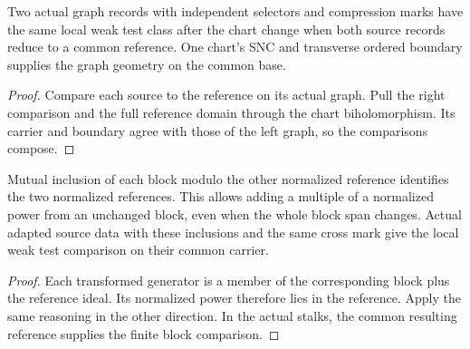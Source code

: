 \begin{theorem}
\label{hir:g1-independent-graph-common-reduction}
\leanok
Two actual graph records with independent selectors and compression
marks have the same local weak test class after the chart change
when both source records reduce to a common reference. One chart's
SNC and transverse ordered boundary supplies the graph geometry
on the common base.
\end{theorem}
\begin{proof}
Compare each source to the reference on its actual graph.
Pull the right comparison and the full reference domain through
the chart biholomorphism. Its carrier and boundary agree
with those of the left graph, so the comparisons compose.
\end{proof}

\begin{theorem}
\label{hir:g1-filtered-weighted-presentation-reference}
\leanok
Mutual inclusion of each block modulo the other normalized reference
identifies the two normalized references. This allows adding a
multiple of a normalized power from an unchanged block, even when
the whole block span changes. Actual adapted source data with
these inclusions and the same cross mark give the local weak
test comparison on their common carrier.
\end{theorem}
\begin{proof}
Each transformed generator is a member of the corresponding
block plus the reference ideal. Its normalized power therefore
lies in the reference. Apply the same reasoning in the other
direction. In the actual stalks, the common resulting reference
supplies the finite block comparison.
\end{proof}

